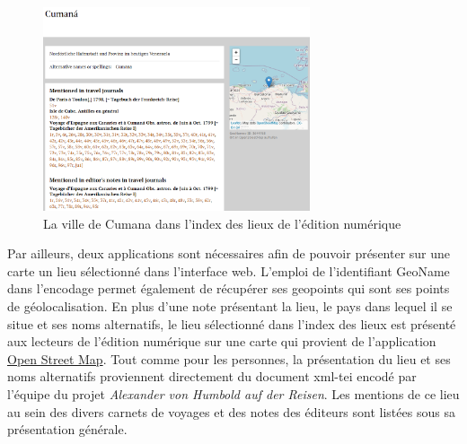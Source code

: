 \documentclass[a4paper, 12pt, twoside]{book}
\begin{document}
\begin{figure}
\centering
\includegraphics[width=0.7\textwidth]{img/index_cumana.png}
\caption{La ville de Cumana dans l'index des lieux de l'édition numérique}
\end{figure}
Par ailleurs, deux applications sont nécessaires afin de pouvoir présenter sur une carte un lieu sélectionné dans l'interface web. L'emploi de l'identifiant GeoName dans l'encodage permet également de récupérer ses geopoints qui sont ses points de géolocalisation. En plus d'une note présentant la lieu, le pays dans lequel il se situe et ses noms alternatifs, le lieu sélectionné dans l'index des lieux est présenté aux lecteurs de l'édition numérique sur une carte qui provient de l'application \href{https://www.openstreetmap.org/}{Open Street Map}. Tout comme pour les personnes, la présentation du lieu et ses noms alternatifs proviennent directement du document \gls{xml}-\gls{tei} encodé par l'équipe du projet \textit{Alexander von Humbold auf der Reisen}. Les mentions de ce lieu au sein des divers carnets de voyages et des notes des éditeurs sont listées sous sa présentation générale.
\end{document}

